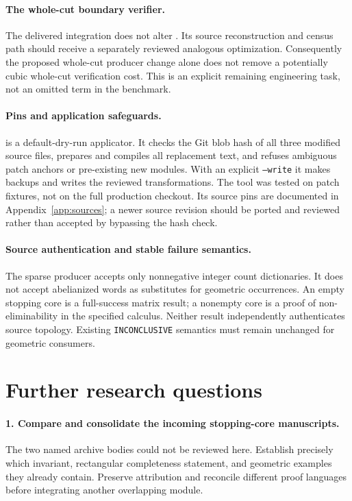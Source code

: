 \documentclass[11pt]{article}
\theoremstyle{definition}\newtheorem{definition}[theorem]{Definition}
\theoremstyle{remark}\newtheorem{remark}[theorem]{Remark}
\begin{document}
\paragraph{The whole-cut boundary verifier.}
The delivered integration does not alter . Its source reconstruction and census path should receive a separately reviewed analogous optimization. Consequently the proposed whole-cut producer change alone does not remove a potentially cubic whole-cut verification cost. This is an explicit remaining engineering task, not an omitted term in the benchmark.

\paragraph{Pins and application safeguards.}
 is a default-dry-run applicator. It checks the Git blob hash of all three modified source files, prepares and compiles all replacement text, and refuses ambiguous patch anchors or pre-existing new modules. With an explicit \texttt{--write} it makes backups and writes the reviewed transformations. The tool was tested on patch fixtures, not on the full production checkout. Its source pins are documented in Appendix~\ref{app:sources}; a newer source revision should be ported and reviewed rather than accepted by bypassing the hash check.

\paragraph{Source authentication and stable failure semantics.}
The sparse producer accepts only nonnegative integer count dictionaries. It does not accept abelianized words as substitutes for geometric occurrences. An empty stopping core is a full-success matrix result; a nonempty core is a proof of non-eliminability in the specified calculus. Neither result independently authenticates source topology. Existing \texttt{INCONCLUSIVE} semantics must remain unchanged for geometric consumers.

\section{Further research questions}
\label{sec:questions}

\paragraph{1. Compare and consolidate the incoming stopping-core manuscripts.}
The two named archive bodies could not be reviewed here. Establish precisely which invariant, rectangular completeness statement, and geometric examples they already contain. Preserve attribution and reconcile different proof languages before integrating another overlapping module.
\end{document}

